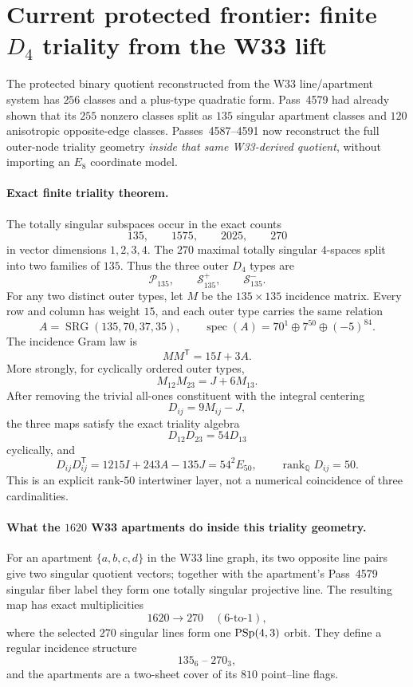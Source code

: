 \section*{Current protected frontier: finite $D_4$ triality from the W33 lift}

The protected binary quotient reconstructed from the W33 line/apartment system has
$256$ classes and a plus-type quadratic form.  Pass~4579 had already shown that its
$255$ nonzero classes split as $135$ singular apartment classes and $120$
anisotropic opposite-edge classes.  Passes~4587--4591 now reconstruct the full
outer-node triality geometry \emph{inside that same W33-derived quotient}, without
importing an $E_8$ coordinate model.

\paragraph{Exact finite triality theorem.}
The totally singular subspaces occur in the exact counts
\[
  135,\qquad 1575,\qquad 2025,\qquad 270
\]
in vector dimensions $1,2,3,4$.  The $270$ maximal totally singular $4$-spaces
split into two families of $135$.  Thus the three outer $D_4$ types are
\[
  \mathcal P_{135},\qquad \mathcal S^+_{135},\qquad \mathcal S^-_{135}.
\]
For any two distinct outer types, let $M$ be the $135\times135$ incidence matrix.
Every row and column has weight $15$, and each outer type carries the same relation
\[
  A=\operatorname{SRG}(135,70,37,35),
  \qquad
  \operatorname{spec}(A)=70^1\oplus7^{50}\oplus(-5)^{84}.
\]
The incidence Gram law is
\[
  MM^{\mathsf T}=15I+3A.
\]
More strongly, for cyclically ordered outer types,
\[
  M_{12}M_{23}=J+6M_{13}.
\]
After removing the trivial all-ones constituent with the integral centering
\[
  D_{ij}=9M_{ij}-J,
\]
the three maps satisfy the exact triality algebra
\[
  \boxed{D_{12}D_{23}=54D_{13}}
\]
cyclically, and
\[
  D_{ij}D_{ij}^{\mathsf T}=1215I+243A-135J=54^2E_{50},
  \qquad \operatorname{rank}_{\mathbb Q}D_{ij}=50.
\]
This is an explicit rank-$50$ intertwiner layer, not a numerical coincidence of
three cardinalities.

\paragraph{What the $1620$ W33 apartments do inside this triality geometry.}
For an apartment $\{a,b,c,d\}$ in the W33 line graph, its two opposite line pairs
give two singular quotient vectors; together with the apartment's Pass~4579
singular fiber label they form one totally singular projective line.  The resulting
map has exact multiplicities
\[
  1620\longrightarrow270\quad(6\text{-to-}1),
\]
where the selected $270$ singular lines form one $\mathrm{PSp}(4,3)$ orbit.  They define a
regular incidence structure
\[
  135_6\;\text{--}\;270_3,
\]
and the apartments are a two-sheet cover of its $810$ point--line flags.

